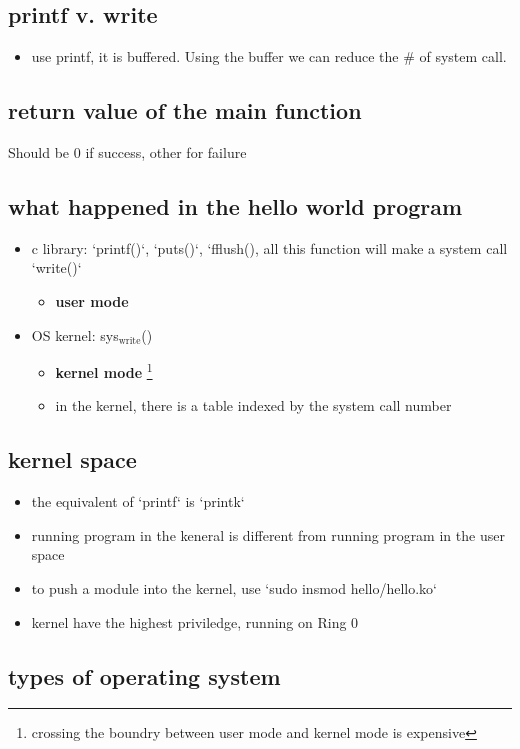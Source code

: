 \documentclass[11pt]{article}
\begin{document}
\subsection{printf v. write}
\label{sec:orgc7d84be}
\begin{itemize}
\item use printf, it is buffered. Using the buffer we can reduce the \# of system call.
\end{itemize}
\subsection{return value of the main function}
\label{sec:org4a3ace2}
Should be 0 if success, other for failure
\subsection{what happened in the hello world program}
\label{sec:orgf1538b5}
\begin{itemize}
\item c library: `printf()`, `puts()`, `fflush(), all this function will make a system call `write()`
\begin{itemize}
\item \textbf{user mode}
\end{itemize}
\item OS kernel: sys\(_{\text{write}}\)()
\begin{itemize}
\item \textbf{kernel mode} \footnote{crossing the boundry between user mode and kernel mode is expensive}
\item in the kernel, there is a table indexed by the system call number
\end{itemize}
\end{itemize}
\subsection{kernel space}
\label{sec:orgb3cba28}
\begin{itemize}
\item the equivalent of `printf` is `printk`
\item running program in the keneral is different from running program in the user space
\item to push a module into the kernel, use `sudo insmod hello/hello.ko`
\item kernel have the highest priviledge, running on Ring 0
\end{itemize}
\subsection{types of operating system}
\label{sec:orgcd7345a}
\end{document}
